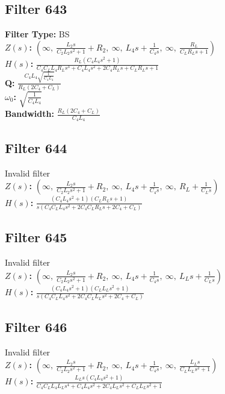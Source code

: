 \documentclass{article}
\begin{document}
\subsection*{Filter 643}
\textbf{Filter Type:} BS \\ 
\textbf{$Z(s)$:} $\left( \infty, \  \frac{L_{2} s}{C_{2} L_{2} s^{2} + 1} + R_{2}, \  \infty, \  L_{4} s + \frac{1}{C_{4} s}, \  \infty, \  \frac{R_{L}}{C_{L} R_{L} s + 1}\right)$ \\ 
\textbf{$H(s)$:} $\frac{R_{L} \left(C_{4} L_{4} s^{2} + 1\right)}{C_{4} C_{L} L_{4} R_{L} s^{3} + C_{4} L_{4} s^{2} + 2 C_{4} R_{L} s + C_{L} R_{L} s + 1}$ \\ 
\textbf{Q:} $\frac{C_{4} L_{4} \sqrt{\frac{1}{C_{4} L_{4}}}}{R_{L} \left(2 C_{4} + C_{L}\right)}$ \\ 
\textbf{$\omega_0$:} $\sqrt{\frac{1}{C_{4} L_{4}}}$ \\ 
\textbf{Bandwidth:} $\frac{R_{L} \left(2 C_{4} + C_{L}\right)}{C_{4} L_{4}}$ \\ 
\subsection*{Filter 644}
Invalid filter \\ 
\textbf{$Z(s)$:} $\left( \infty, \  \frac{L_{2} s}{C_{2} L_{2} s^{2} + 1} + R_{2}, \  \infty, \  L_{4} s + \frac{1}{C_{4} s}, \  \infty, \  R_{L} + \frac{1}{C_{L} s}\right)$ \\ 
\textbf{$H(s)$:} $\frac{\left(C_{4} L_{4} s^{2} + 1\right) \left(C_{L} R_{L} s + 1\right)}{s \left(C_{4} C_{L} L_{4} s^{2} + 2 C_{4} C_{L} R_{L} s + 2 C_{4} + C_{L}\right)}$ \\ 
\subsection*{Filter 645}
Invalid filter \\ 
\textbf{$Z(s)$:} $\left( \infty, \  \frac{L_{2} s}{C_{2} L_{2} s^{2} + 1} + R_{2}, \  \infty, \  L_{4} s + \frac{1}{C_{4} s}, \  \infty, \  L_{L} s + \frac{1}{C_{L} s}\right)$ \\ 
\textbf{$H(s)$:} $\frac{\left(C_{4} L_{4} s^{2} + 1\right) \left(C_{L} L_{L} s^{2} + 1\right)}{s \left(C_{4} C_{L} L_{4} s^{2} + 2 C_{4} C_{L} L_{L} s^{2} + 2 C_{4} + C_{L}\right)}$ \\ 
\subsection*{Filter 646}
Invalid filter \\ 
\textbf{$Z(s)$:} $\left( \infty, \  \frac{L_{2} s}{C_{2} L_{2} s^{2} + 1} + R_{2}, \  \infty, \  L_{4} s + \frac{1}{C_{4} s}, \  \infty, \  \frac{L_{L} s}{C_{L} L_{L} s^{2} + 1}\right)$ \\ 
\textbf{$H(s)$:} $\frac{L_{L} s \left(C_{4} L_{4} s^{2} + 1\right)}{C_{4} C_{L} L_{4} L_{L} s^{4} + C_{4} L_{4} s^{2} + 2 C_{4} L_{L} s^{2} + C_{L} L_{L} s^{2} + 1}$ \\ 
\end{document}
